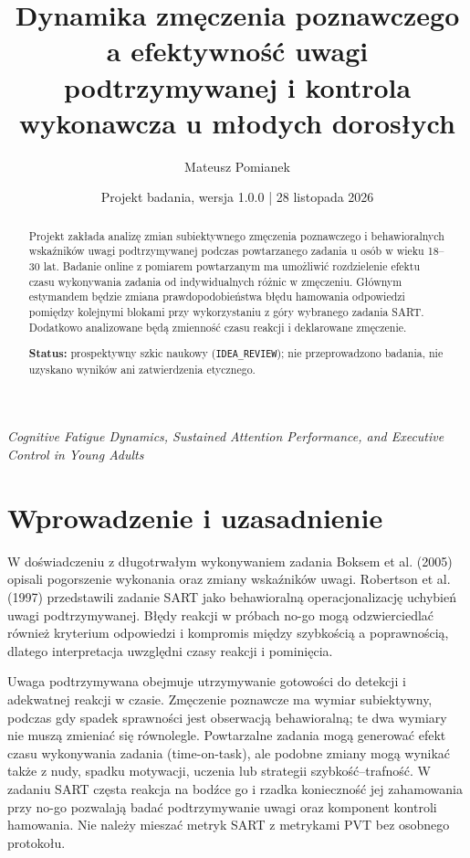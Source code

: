\documentclass[11pt,a4paper]{article}
\title{Dynamika zmęczenia poznawczego a efektywność uwagi podtrzymywanej i kontrola wykonawcza u młodych dorosłych}
\author{Mateusz Pomianek}
\date{Projekt badania, wersja 1.0.0  | 28 listopada 2026}
\begin{document}
\maketitle
\begin{center}
\textit{Cognitive Fatigue Dynamics, Sustained Attention Performance, and Executive Control in Young Adults}
\end{center}
\begin{abstract}
Projekt zakłada analizę zmian subiektywnego zmęczenia poznawczego i behawioralnych wskaźników uwagi podtrzymywanej podczas powtarzanego zadania u osób w wieku 18--30 lat. Badanie online z pomiarem powtarzanym ma umożliwić rozdzielenie efektu czasu wykonywania zadania od indywidualnych różnic w zmęczeniu. Głównym estymandem będzie zmiana prawdopodobieństwa błędu hamowania odpowiedzi pomiędzy kolejnymi blokami przy wykorzystaniu z góry wybranego zadania SART. Dodatkowo analizowane będą zmienność czasu reakcji i deklarowane zmęczenie.

\textbf{Status:} prospektywny szkic naukowy (\texttt{IDEA\_REVIEW}); nie przeprowadzono badania, nie uzyskano wyników ani zatwierdzenia etycznego.
\end{abstract}
\tableofcontents
\section{Wprowadzenie i uzasadnienie}

W doświadczeniu z długotrwałym wykonywaniem zadania Boksem et al. (2005) opisali pogorszenie wykonania oraz zmiany wskaźników uwagi. Robertson et al. (1997) przedstawili zadanie SART jako behawioralną operacjonalizację uchybień uwagi podtrzymywanej. Błędy reakcji w próbach no-go mogą odzwierciedlać również kryterium odpowiedzi i kompromis między szybkością a poprawnością, dlatego interpretacja uwzględni czasy reakcji i pominięcia.

Uwaga podtrzymywana obejmuje utrzymywanie gotowości do detekcji i adekwatnej reakcji w czasie. Zmęczenie poznawcze ma wymiar subiektywny, podczas gdy spadek sprawności jest obserwacją behawioralną; te dwa wymiary nie muszą zmieniać się równolegle. Powtarzalne zadania mogą generować efekt czasu wykonywania zadania (time-on-task), ale podobne zmiany mogą wynikać także z nudy, spadku motywacji, uczenia lub strategii szybkość--trafność. W zadaniu SART częsta reakcja na bodźce go i rzadka konieczność jej zahamowania przy no-go pozwalają badać podtrzymywanie uwagi oraz komponent kontroli hamowania. Nie należy mieszać metryk SART z metrykami PVT bez osobnego protokołu.
\end{document}
